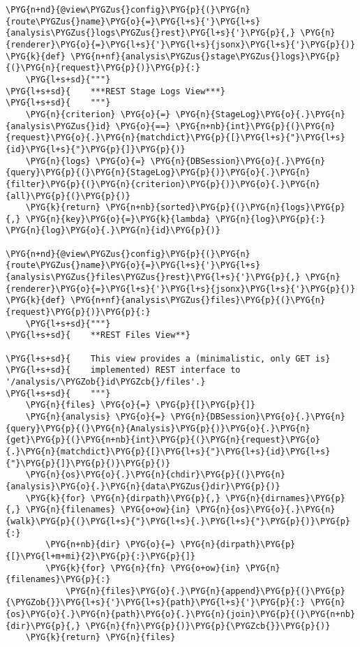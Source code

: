 \begin{Verbatim}[commandchars=\\\{\}]
\PYG{n+nd}{@view\PYGZus{}config}\PYG{p}{(}\PYG{n}{route\PYGZus{}name}\PYG{o}{=}\PYG{l+s}{'}\PYG{l+s}{analysis\PYGZus{}logs\PYGZus{}rest}\PYG{l+s}{'}\PYG{p}{,} \PYG{n}{renderer}\PYG{o}{=}\PYG{l+s}{'}\PYG{l+s}{jsonx}\PYG{l+s}{'}\PYG{p}{)}
\PYG{k}{def} \PYG{n+nf}{analysis\PYGZus{}stage\PYGZus{}logs}\PYG{p}{(}\PYG{n}{request}\PYG{p}{)}\PYG{p}{:}
    \PYG{l+s+sd}{"""}
\PYG{l+s+sd}{    ***REST Stage Logs View***}
\PYG{l+s+sd}{    """}
    \PYG{n}{criterion} \PYG{o}{=} \PYG{n}{StageLog}\PYG{o}{.}\PYG{n}{analysis\PYGZus{}id} \PYG{o}{==} \PYG{n+nb}{int}\PYG{p}{(}\PYG{n}{request}\PYG{o}{.}\PYG{n}{matchdict}\PYG{p}{[}\PYG{l+s}{"}\PYG{l+s}{id}\PYG{l+s}{"}\PYG{p}{]}\PYG{p}{)}
    \PYG{n}{logs} \PYG{o}{=} \PYG{n}{DBSession}\PYG{o}{.}\PYG{n}{query}\PYG{p}{(}\PYG{n}{StageLog}\PYG{p}{)}\PYG{o}{.}\PYG{n}{filter}\PYG{p}{(}\PYG{n}{criterion}\PYG{p}{)}\PYG{o}{.}\PYG{n}{all}\PYG{p}{(}\PYG{p}{)}
    \PYG{k}{return} \PYG{n+nb}{sorted}\PYG{p}{(}\PYG{n}{logs}\PYG{p}{,} \PYG{n}{key}\PYG{o}{=}\PYG{k}{lambda} \PYG{n}{log}\PYG{p}{:} \PYG{n}{log}\PYG{o}{.}\PYG{n}{id}\PYG{p}{)}

\PYG{n+nd}{@view\PYGZus{}config}\PYG{p}{(}\PYG{n}{route\PYGZus{}name}\PYG{o}{=}\PYG{l+s}{'}\PYG{l+s}{analysis\PYGZus{}files\PYGZus{}rest}\PYG{l+s}{'}\PYG{p}{,} \PYG{n}{renderer}\PYG{o}{=}\PYG{l+s}{'}\PYG{l+s}{jsonx}\PYG{l+s}{'}\PYG{p}{)}
\PYG{k}{def} \PYG{n+nf}{analysis\PYGZus{}files}\PYG{p}{(}\PYG{n}{request}\PYG{p}{)}\PYG{p}{:}
    \PYG{l+s+sd}{"""}
\PYG{l+s+sd}{    **REST Files View**}

\PYG{l+s+sd}{    This view provides a (minimalistic, only GET is}
\PYG{l+s+sd}{    implemented) REST interface to '/analysis/\PYGZob{}id\PYGZcb{}/files'.}
\PYG{l+s+sd}{    """}
    \PYG{n}{files} \PYG{o}{=} \PYG{p}{[}\PYG{p}{]}
    \PYG{n}{analysis} \PYG{o}{=} \PYG{n}{DBSession}\PYG{o}{.}\PYG{n}{query}\PYG{p}{(}\PYG{n}{Analysis}\PYG{p}{)}\PYG{o}{.}\PYG{n}{get}\PYG{p}{(}\PYG{n+nb}{int}\PYG{p}{(}\PYG{n}{request}\PYG{o}{.}\PYG{n}{matchdict}\PYG{p}{[}\PYG{l+s}{"}\PYG{l+s}{id}\PYG{l+s}{"}\PYG{p}{]}\PYG{p}{)}\PYG{p}{)}
    \PYG{n}{os}\PYG{o}{.}\PYG{n}{chdir}\PYG{p}{(}\PYG{n}{analysis}\PYG{o}{.}\PYG{n}{data\PYGZus{}dir}\PYG{p}{)}
    \PYG{k}{for} \PYG{n}{dirpath}\PYG{p}{,} \PYG{n}{dirnames}\PYG{p}{,} \PYG{n}{filenames} \PYG{o+ow}{in} \PYG{n}{os}\PYG{o}{.}\PYG{n}{walk}\PYG{p}{(}\PYG{l+s}{"}\PYG{l+s}{.}\PYG{l+s}{"}\PYG{p}{)}\PYG{p}{:}
        \PYG{n+nb}{dir} \PYG{o}{=} \PYG{n}{dirpath}\PYG{p}{[}\PYG{l+m+mi}{2}\PYG{p}{:}\PYG{p}{]}
        \PYG{k}{for} \PYG{n}{fn} \PYG{o+ow}{in} \PYG{n}{filenames}\PYG{p}{:}
            \PYG{n}{files}\PYG{o}{.}\PYG{n}{append}\PYG{p}{(}\PYG{p}{\PYGZob{}}\PYG{l+s}{'}\PYG{l+s}{path}\PYG{l+s}{'}\PYG{p}{:} \PYG{n}{os}\PYG{o}{.}\PYG{n}{path}\PYG{o}{.}\PYG{n}{join}\PYG{p}{(}\PYG{n+nb}{dir}\PYG{p}{,} \PYG{n}{fn}\PYG{p}{)}\PYG{p}{\PYGZcb{}}\PYG{p}{)}
    \PYG{k}{return} \PYG{n}{files}


\end{Verbatim}
